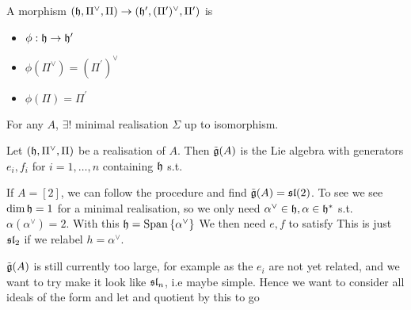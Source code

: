\documentclass{article}
\begin{document}
\begin{definition}
A morphism $(\mathfrak{h},\Pi^\vee,\Pi) \to (\mathfrak{h}^\prime,(\Pi^\prime)^\vee,\Pi^\prime)$ is
\begin{itemize}
    \item $\phi : \mathfrak{h} \to \mathfrak{h}^\prime$ 
    \item $\phi(\Pi^\vee) = (\Pi^\prime)^\vee$
    \item $\phi(\Pi) = \Pi^\prime$
\end{itemize}
\end{definition}

\begin{prop}
For any $A$, $\exists!$ minimal realisation $\Sigma$ up to isomorphism. 
\end{prop}

\begin{definition}
Let $(\mathfrak{h},\Pi^\vee,\Pi)$ be a realisation of $A$. Then $\tilde{\mathfrak{g}}(A)$ is the Lie algebra with generators $e_i,f_i$ for $i=1, \dots, n$ containing $\mathfrak{h}$ s.t. 
\end{definition}



\begin{example}
If $A=[2]$, we can follow the procedure and find $\tilde{\mathfrak{g}}(A) = \mathfrak{sl}(2)$. To see we see $\dim\mathfrak{h}=1$ for a minimal realisation, so we only need $\alpha^\vee \in \mathfrak{h}, \alpha\in \mathfrak{h}^\ast$ s.t. $\alpha(\alpha^\vee)=2$. With this $\mathfrak{h} = \operatorname{Span}\left\{ \alpha^\vee \right\}$ We then need $e,f$ to satisfy 
This is just $\mathfrak{sl}_2$ if we relabel $h = \alpha^\vee$. 
\end{example}

\begin{idea}
	$\tilde{\mathfrak{g}}(A)$ is still currently too large, for example as the $e_i$ are not yet related, and we want to try make it look like $\mathfrak{sl}_n$, i.e maybe simple. Hence we want to consider all ideals of the form 
	and let 
	and quotient by this to go 
\end{idea}
\end{document}
